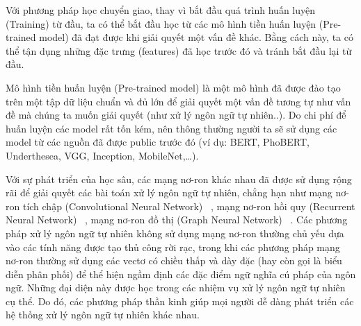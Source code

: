\documentclass[conference]{IEEEtran}
\begin{document}
Với phương pháp học chuyển giao, thay vì bắt đầu quá trình huấn luyện (Training) từ đầu, ta có thể bắt đầu học từ các mô hình tiền huấn luyện (Pre-trained model) đã đạt được khi giải quyết một vấn đề khác. Bằng cách này, ta có thể tận dụng những đặc trưng (features) đã học trước đó và tránh bắt đầu lại từ đầu.

Mô hình tiền huấn luyện (Pre-trained model) là một mô hình đã được đào tạo trên một tập dữ liệu chuẩn và đủ lớn để giải quyết một vấn đề tương tự như vấn đề mà chúng ta muốn giải quyết (như xử lý ngôn ngữ tự nhiên..). Do chi phí để huấn luyện các model rất tốn kém, nên thông thường người ta sẽ sử dụng các model từ các nguồn đã được public trước đó (ví dụ: BERT, PhoBERT, Underthesea, VGG, Inception, MobileNet,…).

Với sự phát triển của học sâu, các mạng nơ-ron khác nhau đã được sử dụng rộng rãi để giải quyết các bài toán xử lý ngôn ngữ tự nhiên, chẳng hạn như mạng nơ-ron tích chập (Convolutional Neural Network) ~\cite{gehring2017convolutional, kalchbrenner-etal-2014-convolutional, kim-2014-convolutional}, mạng nơ-ron hồi quy (Recurrent Neural Network) ~\cite{sutskever-2014-sequence, liu-2016-recurrent}, mạng nơ-ron đồ thị (Graph Neural Network) ~\cite{socher-2013-recursivedeep, tai2015improved, marcheggiani2018exploiting}. Các phương pháp xử lý ngôn ngữ tự nhiên không sử dụng mạng nơ-ron thường chủ yếu dựa vào các tính năng được tạo thủ công rời rạc, trong khi các phương pháp mạng nơ-ron thường sử dụng các vectơ có chiều thấp và dày đặc (hay còn gọi là biểu diễn phân phối) để thể hiện ngầm định các đặc điểm ngữ nghĩa cú pháp của ngôn ngữ. Những đại diện này được học trong các nhiệm vụ xử lý ngôn ngữ tự nhiên cụ thể. Do đó, các phương pháp thần kinh giúp mọi người dễ dàng phát triển các hệ thống xử lý ngôn ngữ tự nhiên khác nhau.
\end{document}
